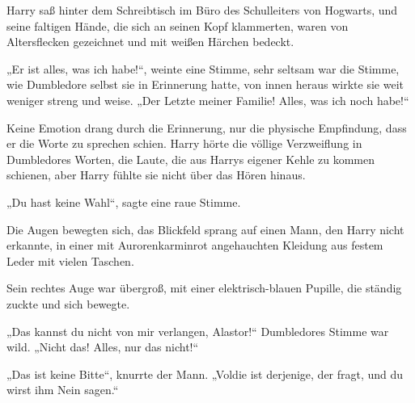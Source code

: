 \begin{em}
Harry saß hinter dem Schreibtisch im Büro des Schulleiters von Hogwarts, und seine faltigen Hände, die sich an seinen Kopf klammerten, waren von Altersflecken gezeichnet und mit weißen Härchen bedeckt.

„Er ist alles, was ich habe!“, weinte eine Stimme, sehr seltsam war die Stimme, wie Dumbledore selbst sie in Erinnerung hatte, von innen heraus wirkte sie weit weniger streng und weise.
„Der Letzte meiner Familie! Alles, was ich noch habe!“

Keine Emotion drang durch die Erinnerung, nur die physische Empfindung, dass er die Worte zu sprechen schien. Harry hörte die völlige Verzweiflung in Dumbledores Worten, die Laute, die aus Harrys eigener Kehle zu kommen schienen, aber Harry fühlte sie nicht über das Hören hinaus.

„Du hast keine Wahl“, sagte eine raue Stimme.

Die Augen bewegten sich, das Blickfeld sprang auf einen Mann, den Harry nicht erkannte, in einer mit Aurorenkarminrot angehauchten Kleidung aus festem Leder mit vielen Taschen.

Sein rechtes Auge war übergroß, mit einer elektrisch-blauen Pupille, die ständig zuckte und sich bewegte.

„Das kannst du nicht von mir verlangen, Alastor!“ Dumbledores Stimme war wild.
„Nicht das! Alles, nur das nicht!“

„Das ist keine Bitte“, knurrte der Mann.
„Voldie ist derjenige, der fragt, und du wirst ihm Nein sagen.“


\end{em}
